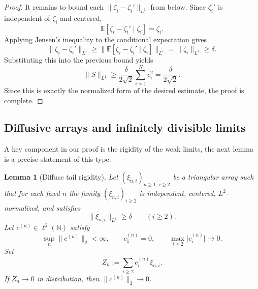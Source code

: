 \documentclass[11pt]{amsart}
\numberwithin{equation}{section}
\newtheorem{lemma}[theorem]{Lemma}
\theoremstyle{definition}
\theoremstyle{remark}
\newcommand{\E}{\mathbb E}
\newcommand{\N}{\mathbb N}
\newcommand{\abs}[1]{\lvert #1 \rvert}
\newcommand{\norm}[1]{\lVert #1 \rVert}
\begin{document}
\begin{proof}
It remains to bound each $\norm{\zeta_i-\zeta_i'}_{L^1}$ from below.  Since
$\zeta_i'$ is independent of $\zeta_i$ and centered,
\[
\E[\zeta_i-\zeta_i' \mid \zeta_i]
=\zeta_i.
\]
Applying Jensen's inequality to the conditional expectation gives
\[
\norm{\zeta_i-\zeta_i'}_{L^1}
\ge
\norm{\E[\zeta_i-\zeta_i' \mid \zeta_i]}_{L^1}
=\norm{\zeta_i}_{L^1}
\ge \delta.
\]
Substituting this into the previous bound yields
\[
\norm{S}_{L^1}
\ge
\frac{\delta}{2\sqrt2}\sum_{i=1}^N c_i^2
=\frac{\delta}{2\sqrt2}.
\]
Since this is exactly the normalized form of the desired estimate, the proof is
complete.
\end{proof}

\subsection{Diffusive arrays and infinitely divisible limits}

A key component in our proof is the rigidity of the weak limits, the next lemma is a precise statement of this type.

\begin{lemma}[Diffuse tail rigidity]\label{lem:tail-rigidity}
Let $(\xi_{n,i})_{n\ge1,\ i\ge2}$ be a triangular array such that for each
fixed $n$ the family $(\xi_{n,i})_{i\ge2}$ is independent, centered,
$L^2$-normalized, and satisfies
\[
\norm{\xi_{n,i}}_{L^1}\ge \delta
\qquad(i\ge2).
\]
Let $c^{(n)}\in \ell^2(\N)$ satisfy
\[
\sup_n \norm{c^{(n)}}_2<\infty,
\qquad
c_1^{(n)}=0,
\qquad
\max_{i\ge2}\abs{c_i^{(n)}}\to0.
\]
Set
\[
Z_n:=\sum_{i\ge2} c_i^{(n)}\xi_{n,i}.
\]
If $Z_n\to0$ in distribution, then $\norm{c^{(n)}}_2\to0$.
\end{lemma}
\end{document}
